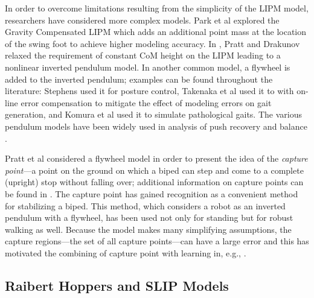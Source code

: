 In order to overcome limitations resulting from the simplicity of the LIPM
model, researchers have considered more complex models.
%
Park et al \cite{Park1998} explored the Gravity Compensated LIPM which adds an
additional point mass at the location of the swing foot to achieve higher
modeling accuracy.
%
In \cite{Pratt2007}, Pratt and Drakunov relaxed the requirement of constant CoM
height on the LIPM leading to a nonlinear inverted pendulum model.
%
In another common model, a flywheel is added to the inverted pendulum;
%
examples can be found throughout the literature:
%
Stephens \cite{Stephens2011} used it for posture control,
%
Takenaka et al \cite{Takenaka2009} used it to with on-line error compensation to
mitigate the effect of modeling errors on gait generation,
%
and Komura et al \cite{Komura2005} used it to simulate pathological gaits.
%
The various pendulum models have been widely used in analysis of push recovery
and balance \cite{Takanishi1990, Hof2005, Hyon2007, Stephens2007}.


%
Pratt et al \cite{Pratt2006} considered a flywheel model in order to present the
idea of the {\em capture point}---a point on the ground on which a biped can
step and come to a complete (upright) stop without falling over;
%
additional information on capture points can be found in \cite{Koolen2012,
  Pratt2012}.
%
The capture point \cite{Pratt2006a} has gained recognition as a convenient
method for stabilizing a biped.
%
%
This method, which considers a robot as an inverted pendulum with a flywheel,
has been used not only for standing but for robust walking as well.
%
Because the model makes many simplifying assumptions, the capture regions---the
set of all capture points---can have a large error and this has motivated the
combining of capture point with learning in, e.g., \cite{Rebula2007}.

\subsection{Raibert Hoppers and SLIP Models}

